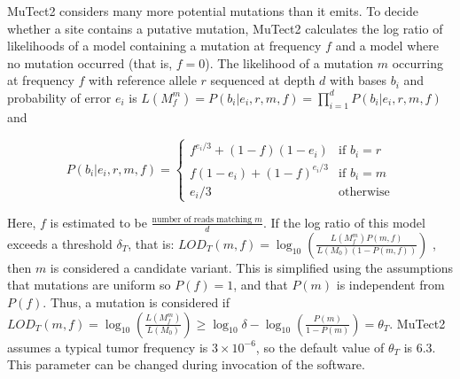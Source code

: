 

MuTect2 considers many more potential mutations than it emits. To decide whether a site contains a putative mutation, MuTect2 calculates the log ratio of likelihoods of a model containing a mutation at frequency $f$ and a model where no mutation occurred (that is, $f = 0$). The likelihood of a mutation $m$ occurring at frequency $f$ with reference allele $r$ sequenced at depth $d$ with bases $b_i$ and probability of error $e_i$ is $L(M_f^m)=P({b_i}|{e_i},r,m,f)=\prod_{i=1}^{d} P(b_i|e_i,r,m,f)$ and 

$$
P(b_i|e_i,r,m,f)=
\begin{cases}
f^{e_i/3}+(1-f)(1-e_i) & \text{if } b_i=r \\
f(1-e_i) + (1-f)^{e_i/3} & \text{if } b_i=m \\
e_i/3 & \text{otherwise}
\end{cases}
$$

Here, $f$ is estimated to be $\frac{\text{number of reads matching }m}{d}$.
If the log ratio of this model exceeds a threshold $\delta{}_T$, that is: $LOD_T(m,f)=\log_{10} \left(\frac{L(M_f^m)P(m,f)}{L(M_0)(1-P(m,f))}\right)$ , then $m$ is considered a candidate variant. This is simplified using the assumptions that mutations are uniform so $P(f)=1$, and that $P(m)$ is independent from $P(f)$. Thus, a mutation is considered if $LOD_T(m,f)=\log_{10} \left(\frac{L(M_f^m)}{L(M_0)}\right) \geq \log_{10} \delta{} - \log_{10}  \left(\frac{P(m)}{1-P(m)}\right) = \theta{}_T$. MuTect2 assumes a typical tumor frequency is $3 \times 10^{-6}$, so the default value of $\theta{}_T$ is 6.3. This parameter can be changed during invocation of the software.

